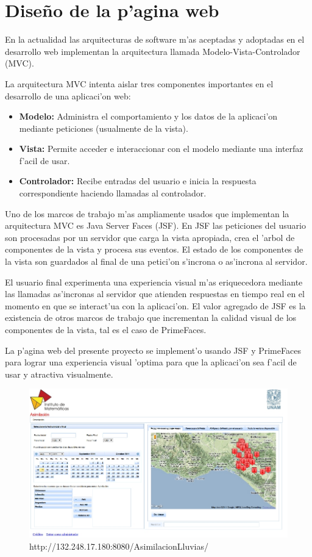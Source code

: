 \section{Dise\~no de la p'agina web}
En la actualidad las arquitecturas de software m'as aceptadas y adoptadas en 
el desarrollo web implementan la arquitectura llamada Modelo-Vista-Controlador (MVC).

La arquitectura MVC intenta aislar tres componentes importantes en el desarrollo
de una aplicaci'on web:

\begin{itemize}
 \item \textbf{Modelo:} Administra el comportamiento y los datos de la aplicaci'on mediante peticiones (usualmente de la vista).
\item \textbf{Vista:} Permite acceder e interaccionar con el modelo mediante una interfaz f'acil de usar.
\item \textbf{Controlador: } Recibe entradas del usuario e inicia la respuesta correspondiente haciendo llamadas al controlador.
\end{itemize}

Uno de los marcos de trabajo m'as ampliamente usados que implementan la arquitectura MVC es Java Server Faces (JSF). En JSF las
peticiones del usuario son procesadas por un servidor que carga la vista apropiada, crea el 'arbol de componentes de la vista y
procesa sus eventos. El estado de los componentes de la vista son guardados al final de una petici'on s'incrona o as'incrona al servidor.

El usuario final experimenta una experiencia visual m'as eriquecedora mediante las llamadas as'incronas al servidor que atienden
respuestas en tiempo real en el momento en que se interact'ua con la aplicaci'on. El valor agregado de JSF es la existencia de otros
marcos de trabajo que incrementan la calidad visual de los componentes de la vista, tal es el caso de PrimeFaces.

La p'agina web del presente proyecto se implement'o usando JSF y PrimeFaces para lograr una experiencia visual 'optima
para que la aplicaci'on sea f'acil de usar y atractiva visualmente.

\begin{figure}[!ht]
 \centering
 \includegraphics[width=180mm]{./imagenes/pagWeb.jpg}
 \caption{http://132.248.17.180:8080/AsimilacionLluvias/}
\end{figure}


